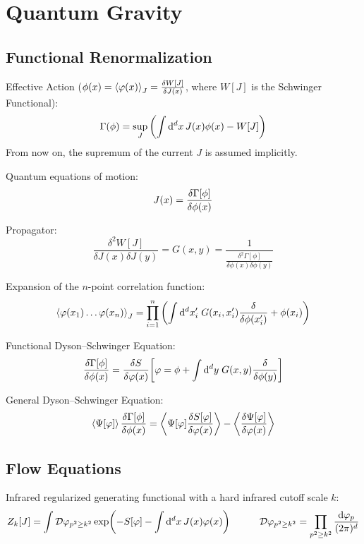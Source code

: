 \section{Quantum Gravity}
	\subsection{Functional Renormalization}
		Effective Action ($\phi(x) = \Avg{\varphi(x)}_J = \fdv{W\qty[J]}{J(x)}$, where $W[J]$ is the Schwinger Functional):
		\begin{equation}
			\Gamma(\phi) = \sup_{J} \qty( \int \dd^d x \, J(x) \phi(x) - W[J])
		\end{equation}
		From now on, the supremum of the current $J$ is assumed implicitly.

		\noindent
		Quantum equations of motion:
		\begin{equation}
			J(x)=\fdv{\Gamma\qty[\phi]}{\phi(x)}
		\end{equation}

		\noindent
		Propagator:
		\begin{equation}
			\frac{\delta^2 W[J]}{\delta J(x) \delta J(y)} = G(x,y) = \frac{1}{\frac{\delta^2\Gamma[\phi]}{\delta \phi(x) \delta \phi(y)}}
		\end{equation}

		\noindent
		Expansion of the $n$-point correlation function:
		\begin{equation}
			\Avg{\varphi(x_1) \hdots\varphi(x_n)}_J = \prod_{i=1}^{n} \qty(\int \dd^d x'_i \;G(x_i,x'_i) \fdv{\phi(x'_i)} + \phi(x_i))
		\end{equation}

		\noindent
		Functional Dyson--Schwinger Equation:
		\begin{equation}
			\fdv{\Gamma[\phi]}{\phi(x)} = \fdv{S}{\varphi(x)}\qty[\varphi = \phi + \int \dd^d y\; G(x,y) \fdv{}{\phi(y)}]
		\end{equation}

		\noindent
		General Dyson--Schwinger Equation:
		\begin{equation}
			\Avg{\Psi[\varphi]} \fdv{\Gamma[\phi]}{\phi(x)} = \Avg{\Psi[\varphi] \fdv{S[\varphi]}{\varphi(x)}} - \Avg{\fdv{\Psi[\varphi]}{\varphi(x)}}
		\end{equation}

	\subsection{Flow Equations}
		Infrared regularized generating functional with a hard infrared cutoff scale $k$:
		\begin{equation}
			Z_k[J] = \int \mathcal{D}\varphi_{p^2 \ge k^2} \exp(-S[\varphi] - \int \dd^d x \, J(x) \varphi(x))
			\hspace{30pt} \mathcal{D}\varphi_{p^2 \ge k^2} = \prod_{p^2 \ge k^2} \frac{\dd \varphi_p}{(2\pi)^d}
		\end{equation}

